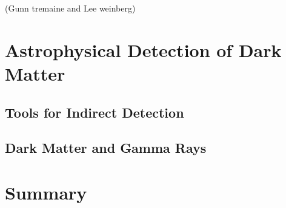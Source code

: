 (Gunn tremaine and Lee weinberg)

\section{Astrophysical Detection of Dark Matter}

\subsection{Tools for Indirect Detection}

\subsection{Dark Matter and Gamma Rays}

\section{Summary}



